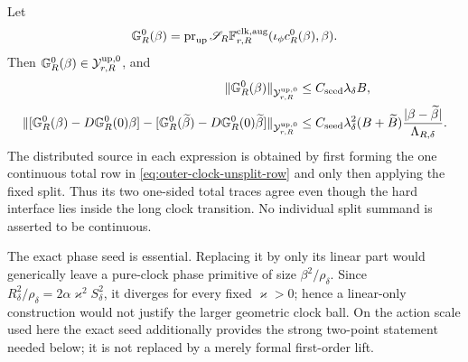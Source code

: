 \begin{proposition}
Let
\begin{equation}
 \mathbb G_R^0(\beta)
 =\operatorname{pr}_{\rm up}\mathscr S_R
    \mathbb F_{r,R}^{\rm clk,aug}
       (\iota_\phi c_R^0(\beta),\beta).          \label{eq:outer-clock-seed-upper-forcing}
\end{equation}
Then \(\mathbb G_R^0(\beta)\in\mathcal Y_{r,R}^{\rm up,0}\), and
\begin{align}
 \|\mathbb G_R^0(\beta)\|_{\mathcal Y_{r,R}^{\rm up,0}}
 &\le C_{\rm seed}\lambda_\delta B,\notag\\
 \|[\mathbb G_R^0(\beta)-D\mathbb G_R^0(0)\beta]
   -[\mathbb G_R^0(\widetilde\beta)
        -D\mathbb G_R^0(0)\widetilde\beta]\|_
       {\mathcal Y_{r,R}^{\rm up,0}}
 &\le C_{\rm seed}\lambda_\delta^2(B+\widetilde B)
       \frac{|\beta-\widetilde\beta|}
            {\Lambda_{R,\delta}}.               \label{eq:outer-clock-seed-forcing-two-point}
\end{align}
The distributed source in each expression is obtained by first forming
the one continuous total row in \cref{eq:outer-clock-unsplit-row} and
only then applying the fixed split.  Thus its two one-sided total traces
agree even though the hard interface lies inside the long clock
transition.  No individual split summand is asserted to be continuous.

The exact phase seed is essential.  Replacing it by only its linear part
would generically leave a pure-clock phase primitive of size
\(\beta^2/\rho_\delta\).  Since
\(R_\delta^2/\rho_\delta=2\alpha\varkappa^2S_\delta^2\), it diverges
for every fixed \(\varkappa>0\); hence a linear-only construction would
not justify the larger geometric clock ball.  On the action scale used
here the exact seed additionally provides the strong two-point statement
needed below; it is not replaced by a merely formal first-order lift.
\end{proposition}

